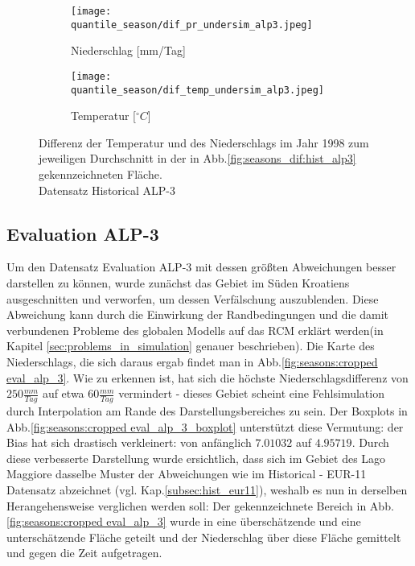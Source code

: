 \begin{figure}[h!]
	\begin{subfigure}{0.49\textwidth}
		\texttt{[image: quantile\_season/dif\_pr\_undersim\_alp3.jpeg]}
		\caption{Niederschlag [mm/Tag]}
	\end{subfigure}
	\begin{subfigure}{0.49\textwidth}
		\texttt{[image: quantile\_season/dif\_temp\_undersim\_alp3.jpeg]}
		\caption{Temperatur [$^\circ C$]}
	\end{subfigure}
	\caption{Differenz der Temperatur und des Niederschlags im Jahr 1998 zum jeweiligen Durchschnitt in der in Abb.\ref{fig:seasons_dif:hist_alp3} gekennzeichneten Fläche.\\Datensatz Historical ALP-3}
	\label{fig:seasons:mean_alp3}
\end{figure}

\newpage
\subsection{Evaluation ALP-3}\label{subsec:eval_alp3}
Um den Datensatz Evaluation ALP-3 mit dessen größten Abweichungen besser darstellen zu können, wurde zunächst das Gebiet im Süden Kroatiens ausgeschnitten und verworfen, um dessen Verfälschung auszublenden. Diese Abweichung kann durch die Einwirkung der Randbedingungen und die damit verbundenen Probleme des globalen Modells auf das RCM erklärt werden(in Kapitel \ref{sec:problems_in_simulation} genauer beschrieben). Die Karte des Niederschlags, die sich daraus ergab findet man in Abb.\ref{fig:seasons:cropped eval_alp_3}. Wie zu erkennen ist, hat sich die höchste Niederschlagsdifferenz von $250\frac{mm}{Tag}$ auf etwa $60\frac{mm}{Tag}$ vermindert - dieses Gebiet scheint eine Fehlsimulation durch Interpolation am Rande des Darstellungsbereiches zu sein. Der Boxplots in Abb.\ref{fig:seasons:cropped eval_alp_3_boxplot} unterstützt diese Vermutung: der Bias hat sich drastisch verkleinert: von anfänglich $7.01032$ auf $4.95719$. Durch diese verbesserte Darstellung wurde ersichtlich, dass sich im Gebiet des Lago Maggiore dasselbe Muster der Abweichungen wie im Historical - EUR-11 Datensatz abzeichnet (vgl. Kap.\ref{subsec:hist_eur11}), weshalb es nun in derselben Herangehensweise verglichen werden soll: Der gekennzeichnete Bereich in Abb.\ref{fig:seasons:cropped eval_alp_3} wurde in eine überschätzende und eine unterschätzende Fläche geteilt und der Niederschlag über diese Fläche gemittelt und gegen die Zeit aufgetragen.\\

